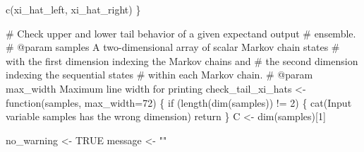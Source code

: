 \documentclass[
  letterpaper,
  DIV=11,
  numbers=noendperiod]{scrartcl}
\newenvironment{Shaded}{\begin{snugshade}}{\end{snugshade}}
\newcommand{\AttributeTok}[1]{\textcolor[rgb]{0.40,0.45,0.13}{#1}}
\newcommand{\CommentTok}[1]{\textcolor[rgb]{0.37,0.37,0.37}{#1}}
\newcommand{\ConstantTok}[1]{\textcolor[rgb]{0.56,0.35,0.01}{#1}}
\newcommand{\ControlFlowTok}[1]{\textcolor[rgb]{0.00,0.23,0.31}{#1}}
\newcommand{\DecValTok}[1]{\textcolor[rgb]{0.68,0.00,0.00}{#1}}
\newcommand{\FunctionTok}[1]{\textcolor[rgb]{0.28,0.35,0.67}{#1}}
\newcommand{\NormalTok}[1]{\textcolor[rgb]{0.00,0.23,0.31}{#1}}
\newcommand{\OtherTok}[1]{\textcolor[rgb]{0.00,0.23,0.31}{#1}}
\newcommand{\SpecialCharTok}[1]{\textcolor[rgb]{0.37,0.37,0.37}{#1}}
\newcommand{\StringTok}[1]{\textcolor[rgb]{0.13,0.47,0.30}{#1}}
\begin{document}
\begin{Shaded}
\begin{Highlighting}[]
  \FunctionTok{c}\NormalTok{(xi\_hat\_left, xi\_hat\_right)}
\NormalTok{\}}

\CommentTok{\# Check upper and lower tail behavior of a given expectand output }
\CommentTok{\# ensemble.}
\CommentTok{\# @param samples A two{-}dimensional array of scalar Markov chain states }
\CommentTok{\#                with the first dimension indexing the Markov chains and }
\CommentTok{\#                the second dimension indexing the sequential states }
\CommentTok{\#                within each Markov chain.}
\CommentTok{\# @param max\_width Maximum line width for printing}
\NormalTok{check\_tail\_xi\_hats }\OtherTok{\textless{}{-}} \ControlFlowTok{function}\NormalTok{(samples, }\AttributeTok{max\_width=}\DecValTok{72}\NormalTok{) \{}
  \ControlFlowTok{if}\NormalTok{ (}\FunctionTok{length}\NormalTok{(}\FunctionTok{dim}\NormalTok{(samples)) }\SpecialCharTok{!=} \DecValTok{2}\NormalTok{) \{}
    \FunctionTok{cat}\NormalTok{(}\StringTok{\textquotesingle{}Input variable \textasciigrave{}samples\textasciigrave{} has the wrong dimension\textquotesingle{}}\NormalTok{)}
\NormalTok{    return}
\NormalTok{  \}}
\NormalTok{  C }\OtherTok{\textless{}{-}} \FunctionTok{dim}\NormalTok{(samples)[}\DecValTok{1}\NormalTok{]}
  
\NormalTok{  no\_warning }\OtherTok{\textless{}{-}} \ConstantTok{TRUE}
\NormalTok{  message }\OtherTok{\textless{}{-}} \StringTok{""}
  

\end{Highlighting}
\end{Shaded}
\end{document}
